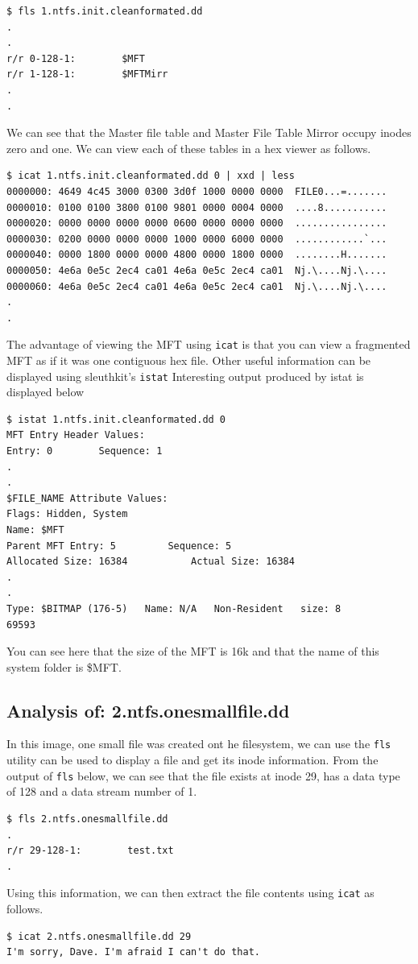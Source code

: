 \documentclass[a4paper,
    11pt,
    normalheadings,
    parindent,
    UKenglish,
    abstracton,
    ]{scrartcl}
\begin{document}
\begin{verbatim}
$ fls 1.ntfs.init.cleanformated.dd
.
.
r/r 0-128-1:        $MFT
r/r 1-128-1:        $MFTMirr
.
.
\end{verbatim}
We can see that the Master file table and Master File Table Mirror occupy inodes zero and one. We can view each of these tables in a hex viewer as follows.
\begin{verbatim}
$ icat 1.ntfs.init.cleanformated.dd 0 | xxd | less
0000000: 4649 4c45 3000 0300 3d0f 1000 0000 0000  FILE0...=.......
0000010: 0100 0100 3800 0100 9801 0000 0004 0000  ....8...........
0000020: 0000 0000 0000 0000 0600 0000 0000 0000  ................
0000030: 0200 0000 0000 0000 1000 0000 6000 0000  ............`...
0000040: 0000 1800 0000 0000 4800 0000 1800 0000  ........H.......
0000050: 4e6a 0e5c 2ec4 ca01 4e6a 0e5c 2ec4 ca01  Nj.\....Nj.\....
0000060: 4e6a 0e5c 2ec4 ca01 4e6a 0e5c 2ec4 ca01  Nj.\....Nj.\....
.
.
\end{verbatim}
The advantage of viewing the MFT using \texttt{icat} is that you can view a fragmented MFT as if it was one contiguous hex file. Other useful information can be displayed using sleuthkit's \texttt{istat}
Interesting output produced by istat is displayed below
\begin{verbatim}
$ istat 1.ntfs.init.cleanformated.dd 0
MFT Entry Header Values:
Entry: 0        Sequence: 1
.
.
$FILE_NAME Attribute Values:
Flags: Hidden, System
Name: $MFT
Parent MFT Entry: 5         Sequence: 5
Allocated Size: 16384           Actual Size: 16384
.
.
Type: $BITMAP (176-5)   Name: N/A   Non-Resident   size: 8
69593
\end{verbatim}
You can see here that the size of the MFT is 16k and that the name of this system folder is \$MFT.

\subsection{Analysis of: 2.ntfs.onesmallfile.dd}
In this image, one small file was created ont he filesystem, we can use the  \texttt{fls} utility can be used to display a file and get its inode information.
From the output of \texttt{fls} below, we can see that the file exists at inode 29, has a data type of 128 and a data stream number of 1.

\begin{verbatim}
$ fls 2.ntfs.onesmallfile.dd
.
r/r 29-128-1:        test.txt
.
\end{verbatim}
Using this information, we can then extract the file contents using \texttt{icat} as follows.
\begin{verbatim}
$ icat 2.ntfs.onesmallfile.dd 29
I'm sorry, Dave. I'm afraid I can't do that.
\end{verbatim}
\end{document}
